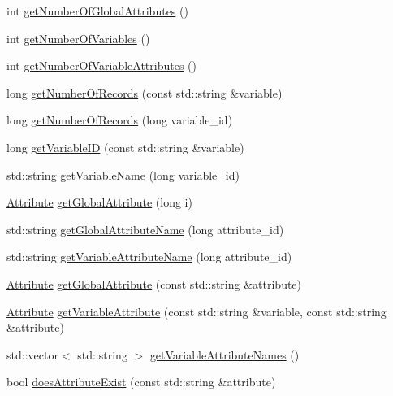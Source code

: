 \begin{DoxyCompactItemize}
\item 
int \hyperlink{classccmc_1_1_general_file_reader_a4d5b8ad6260f905b37f802ee03779914}{get\-Number\-Of\-Global\-Attributes} ()
\item 
int \hyperlink{classccmc_1_1_general_file_reader_a7230506f5c5b62d33ef63864ef93a75c}{get\-Number\-Of\-Variables} ()
\item 
int \hyperlink{classccmc_1_1_general_file_reader_a26826f6d17d297b4d4891c91ecf255af}{get\-Number\-Of\-Variable\-Attributes} ()
\item 
long \hyperlink{classccmc_1_1_general_file_reader_abd0a8c94efea9fc7f9ac3b1c1d5fe9d2}{get\-Number\-Of\-Records} (const std\-::string \&variable)
\item 
long \hyperlink{classccmc_1_1_general_file_reader_af720e4662deb1be6209cb5d2c2e9ff20}{get\-Number\-Of\-Records} (long variable\-\_\-id)
\item 
long \hyperlink{classccmc_1_1_general_file_reader_a6cc488b707602f3b4438408826d3df02}{get\-Variable\-I\-D} (const std\-::string \&variable)
\item 
std\-::string \hyperlink{classccmc_1_1_general_file_reader_a24a28efa48973345d705d9e379cacc12}{get\-Variable\-Name} (long variable\-\_\-id)
\item 
\hyperlink{classccmc_1_1_attribute}{Attribute} \hyperlink{classccmc_1_1_general_file_reader_a45b01633354be559eed7cc6c854573c1}{get\-Global\-Attribute} (long i)
\item 
std\-::string \hyperlink{classccmc_1_1_general_file_reader_ab7fd42f992e99ec28860e49cd8396126}{get\-Global\-Attribute\-Name} (long attribute\-\_\-id)
\item 
std\-::string \hyperlink{classccmc_1_1_general_file_reader_a37342bc8999fdda1ee4ad52a62af650c}{get\-Variable\-Attribute\-Name} (long attribute\-\_\-id)
\item 
\hyperlink{classccmc_1_1_attribute}{Attribute} \hyperlink{classccmc_1_1_general_file_reader_abd1d4ce80397965b7d4ddbc9435c0bdd}{get\-Global\-Attribute} (const std\-::string \&attribute)
\item 
\hyperlink{classccmc_1_1_attribute}{Attribute} \hyperlink{classccmc_1_1_general_file_reader_a8a683e97f0affa385344a0da5b7afd1a}{get\-Variable\-Attribute} (const std\-::string \&variable, const std\-::string \&attribute)
\item 
std\-::vector$<$ std\-::string $>$ \hyperlink{classccmc_1_1_general_file_reader_a6e3e6cdd1bab8ee979c0f13276291331}{get\-Variable\-Attribute\-Names} ()
\item 
bool \hyperlink{classccmc_1_1_general_file_reader_a2038ca818d84aec04ecf2b6fdd8710ce}{does\-Attribute\-Exist} (const std\-::string \&attribute)

\end{DoxyCompactItemize}
